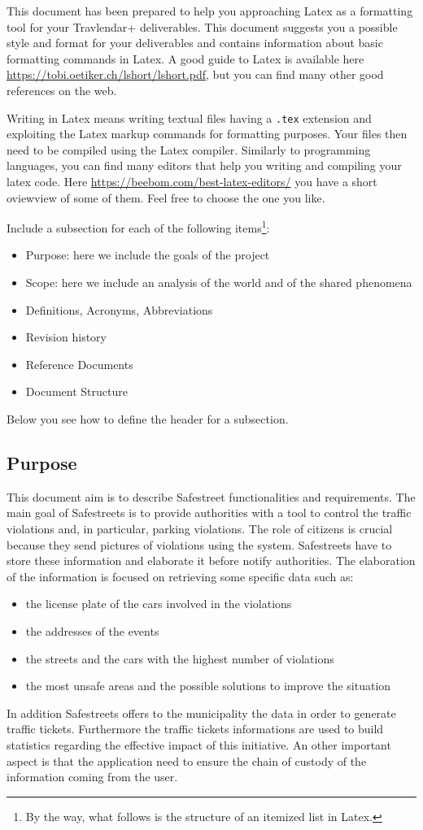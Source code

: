 This document has been prepared to help you approaching Latex as a formatting tool for your Travlendar+ deliverables. This document suggests you a possible style and format for your deliverables and contains information about basic formatting commands in Latex. A good guide to Latex is available here \href{https://tobi.oetiker.ch/lshort/lshort.pdf}{https://tobi.oetiker.ch/lshort/lshort.pdf}, but you can find many other good references on the web. 

Writing in Latex means writing textual files having a \texttt{.tex} extension and exploiting the Latex markup commands for formatting purposes. Your files then need to be compiled using the Latex compiler. Similarly to programming languages, you can find many editors that help you writing and compiling your latex code. Here \href{https://beebom.com/best-latex-editors/}{https://beebom.com/best-latex-editors/} you have a short oviewview of some of them. Feel free to choose the one you like.  

Include a subsection for each of the following items\footnote{By the way, what follows is the structure of an itemized list in Latex.}:
\begin{itemize}
\item
Purpose: here we include the goals of the project
\item
Scope: here we include an analysis of the world and of the shared phenomena
\item
Definitions, Acronyms, Abbreviations
\item
Revision history
\item
Reference Documents 
\item
Document Structure
\end{itemize}
Below you see how to define the header for a subsection.
\subsection{Purpose}
This document aim is to describe Safestreet functionalities and requirements.
The main goal of Safestreets is to provide authorities with a tool to control the traffic violations and, in particular, parking violations. The role of citizens is crucial because they send pictures of violations using the system. Safestreets have to store these information and elaborate it before notify authorities.
The elaboration of the information is focused on retrieving some specific data such as:
\begin{itemize}
	\item
	the license plate of the cars involved in the violations
	\item
	the addresses of the events
	\item 
	the streets and the cars with the highest number of violations
	\item 
	the most unsafe areas and the possible solutions to improve the situation
\end{itemize}
In addition Safestreets offers to the municipality the data in order to generate traffic tickets. Furthermore the traffic tickets informations are used to build statistics regarding the effective impact of this initiative.
An other important aspect is that the application need to ensure the chain of custody of the information coming from the user.
